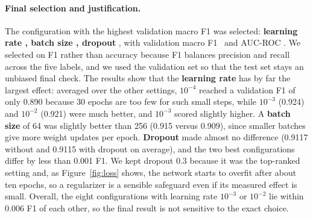 \begin{table}[htbp]
\centering
{}
\caption{Hyperparameter search results on the validation set (best row in bold).}
\label{tab:tuning}
\end{table}


\paragraph{Final selection and justification.} The configuration with the highest validation macro F1 was selected: \textbf{learning rate \bestLR, batch size \bestBatch, dropout \bestDrop}, with validation macro F1 \bestValF\ and AUC-ROC \bestValAUC. We selected on F1 rather than accuracy because F1 balances precision and recall across the five labels, and we used the validation set so that the test set stays an unbiased final check. The results show that the \textbf{learning rate} has by far the largest effect: averaged over the other settings, $10^{-4}$ reached a validation F1 of only 0.890 because 30 epochs are too few for such small steps, while $10^{-3}$ (0.924) and $10^{-2}$ (0.921) were much better, and $10^{-3}$ scored slightly higher. A \textbf{batch size} of 64 was slightly better than 256 (0.915 versus 0.909), since smaller batches give more weight updates per epoch. \textbf{Dropout} made almost no difference (0.9117 without and 0.9115 with dropout on average), and the two best configurations differ by less than 0.001 F1. We kept dropout 0.3 because it was the top-ranked setting and, as Figure~\ref{fig:loss} shows, the network starts to overfit after about ten epochs, so a regularizer is a sensible safeguard even if its measured effect is small. Overall, the eight configurations with learning rate $10^{-3}$ or $10^{-2}$ lie within 0.006 F1 of each other, so the final result is not sensitive to the exact choice.